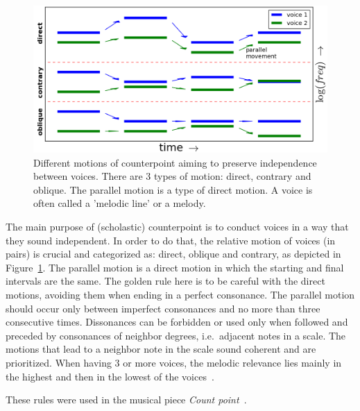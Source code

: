 \begin{figure}[h!]
    \centering
        \includegraphics[width=.8\columnwidth]{figures/movContraponto_}
    \caption{Different motions of counterpoint aiming to preserve independence
        between voices. There are 3 types of motion: direct, contrary and
        oblique. The parallel motion is a type of direct motion.
	A voice is often called a 'melodic line' or a melody.}
        \label{fig:movContraponto}
\end{figure}

The main purpose of (scholastic) counterpoint is to conduct voices in a way that they sound independent.
In order to do that, the relative motion of voices (in pairs) is crucial and
categorized as: direct, oblique and contrary, as depicted in Figure~\ref{fig:movContraponto}.
The parallel motion is a direct motion in which the starting and final intervals are the same.
The golden rule here is to be careful with the direct motions, avoiding them
when ending in a perfect consonance.
The parallel motion should occur only between
imperfect consonances and no more than three consecutive times.
Dissonances can be forbidden or used only when followed and preceded by consonances of neighbor
degrees, i.e.\ adjacent notes in a scale.
The motions that lead to a
neighbor note in the scale sound coherent and are prioritized.
When having 3 or more voices, the melodic
relevance lies mainly in the highest and then in the lowest of the voices~\cite{Fux,Tragtenberg,SchoenbergContra}.

These rules were used in the musical piece \emph{Count point}~\cite{MASSA}.

